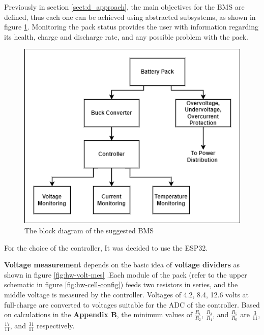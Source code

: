 Previously in section \ref{sect:d_approach}, the main objectives for the BMS are defined, thus each one can be achieved using abstracted subsystems, as shown in figure \ref{fig:hw-power-blk2}. Monitoring the pack status provides the user with information regarding its health, charge and discharge rate, and any possible problem with the pack.
\newpage
\begin{figure}[h!]
	\centering
	\includegraphics[scale=0.5]{./Figures/HW/BMS-drawing.png}
	\caption{The block diagram of the suggested BMS}
	\label{fig:hw-power-blk2}
\end{figure}

 For the choice of the controller, It was decided to use the ESP32. %


\textbf{Voltage measurement} depends on the basic idea of \textbf{voltage dividers} as shown in figure \ref{fig:hw-volt-mes} .Each module of the pack (refer to the upper schematic in figure \ref{fig:hw-cell-config}) feeds two resistors in series, and the middle voltage is measured by the controller. Voltages of 4.2, 8.4, 12.6 volts at full-charge are converted to voltages suitable for the ADC of the controller. Based on calculations in the \textbf{Appendix B}, the minimum values of $\frac{R_1}{R_2}$, $\frac{R_3}{R_4}$, and $\frac{R_5}{R_6}$ are $\frac{3}{11}$,$\frac{17}{11}$, and $\frac{31}{11}$ respectively.

